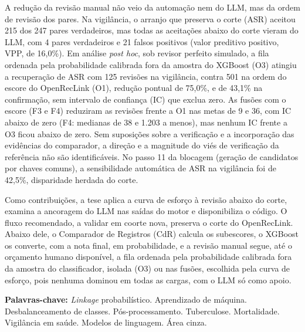 \documentclass[12pt,a4paper,openany]{book}
\begin{document}
A redução da revisão manual não veio da automação nem do LLM, mas da ordem de revisão dos pares. Na vigilância, o arranjo que preserva o corte (ASR) aceitou 215 dos 247 pares verdadeiros, mas todas as aceitações abaixo do corte vieram do LLM, com 4 pares verdadeiros e 21 falsos positivos (valor preditivo positivo, VPP, de 16,0\%). Em análise \textit{post hoc}, sob revisor perfeito simulado, a fila ordenada pela probabilidade calibrada fora da amostra do XGBoost (O3) atingiu a recuperação de ASR com 125 revisões na vigilância, contra 501 na ordem do escore do OpenRecLink (O1), redução pontual de 75,0\%, e de 43,1\% na confirmação, sem intervalo de confiança (IC) que exclua zero. As fusões com o escore (F3 e F4) reduziram as revisões frente a O1 nas metas de 9 e 36, com IC abaixo de zero (F4: medianas de 38 e 1.203 a menos), mas nenhum IC frente a O3 ficou abaixo de zero. Sem suposições sobre a verificação e a incorporação das evidências do comparador, a direção e a magnitude do viés de verificação da referência não são identificáveis. No passo 11 da blocagem (geração de candidatos por chaves comuns), a sensibilidade automática de ASR na vigilância foi de 42,5\%, disparidade herdada do corte.

Como contribuições, a tese aplica a curva de esforço à revisão abaixo do corte, examina a ancoragem do LLM nas saídas do motor e disponibiliza o código. O fluxo recomendado, a validar em coorte nova, preserva o corte do OpenRecLink. Abaixo dele, o Comparador de Registros (CdR) calcula os subescores, o XGBoost os converte, com a nota final, em probabilidade, e a revisão manual segue, até o orçamento humano disponível, a fila ordenada pela probabilidade calibrada fora da amostra do classificador, isolada (O3) ou nas fusões, escolhida pela curva de esforço, pois nenhuma dominou em todas as cargas, com o LLM só como apoio.

\vspace{15pt}

\textbf{Palavras-chave:} \textit{Linkage} probabilístico. Aprendizado de máquina. Desbalanceamento de classes. Pós-processamento. Tuberculose. Mortalidade. Vigilância em saúde. Modelos de linguagem. Área cinza.





\newpage

\noindent
\end{document}
